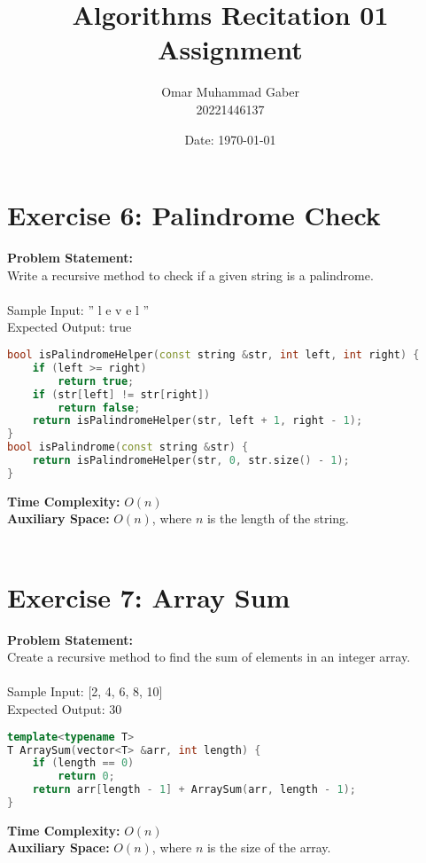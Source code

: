 \documentclass{article}
\title{Algorithms Recitation 01 Assignment}
\date{Date: \today}
\author{\Large Omar Muhammad Gaber \\ \Large 20221446137}
\begin{document}
\maketitle

\section{Exercise 6: Palindrome Check}
\textbf{Problem Statement:}\\
Write a recursive method to check if a given string is a palindrome.\\\\
Sample Input: ” l e v e l ”\\
Expected Output: true

\begin{lstlisting}[language=C++, caption={Palindrome Check Subprogram}, label=cppcode]
bool isPalindromeHelper(const string &str, int left, int right) {
    if (left >= right)
        return true;
    if (str[left] != str[right])
        return false;
    return isPalindromeHelper(str, left + 1, right - 1);
}
bool isPalindrome(const string &str) {
    return isPalindromeHelper(str, 0, str.size() - 1);
}
\end{lstlisting}

\textbf{Time Complexity:} $O(n)$\\
\textbf{Auxiliary Space:} $O(n)$, where $n$ is the length of the string.\\\\

\section{Exercise 7: Array Sum}
\textbf{Problem Statement:}\\
Create a recursive method to find the sum of elements in an integer array.\\\\
Sample Input: [2, 4, 6, 8, 10]\\
Expected Output: 30

\begin{lstlisting}[language=C++, caption={Array Sum Subprogram}, label=cppcode]
template<typename T>
T ArraySum(vector<T> &arr, int length) {
    if (length == 0)
        return 0;
    return arr[length - 1] + ArraySum(arr, length - 1);
}
\end{lstlisting}

\textbf{Time Complexity:} $O(n)$\\
\textbf{Auxiliary Space:} $O(n)$, where $n$ is the size of the array.\\\\
\end{document}
